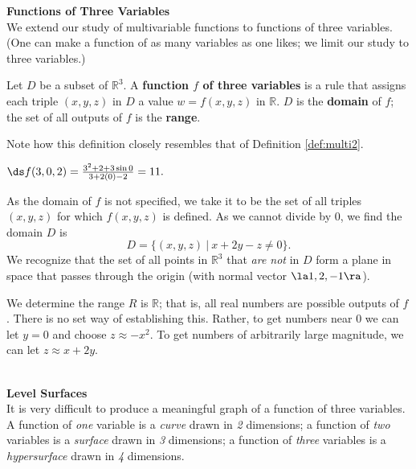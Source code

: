 \noindent\textbf{\large Functions of Three Variables}\\

We extend our study of multivariable functions to functions of three variables. (One can make a function of as many variables as one likes; we limit our study to three variables.)

{Let $D$ be a subset of $\mathbb{R}^3$. A \textbf{function $f$ of three variables} is a rule that assigns each triple $(x,y,z)$ in $D$ a value $w=f(x,y,z)$ in $\mathbb{R}$. $D$ is the \textbf{domain} of $f$; the set of all outputs of $f$ is the \textbf{range}.
}

Note how this definition closely resembles that of Definition \ref{def:multi2}.\\

{$\ds f(3,0,2) = \frac{3^2+2+3\sin 0}{3+2(0)-2} = 11.$

As the domain of $f$ is not specified, we take it to be the set of all triples $(x,y,z)$ for which $f(x,y,z)$ is defined. As we cannot divide by $0$, we find the domain $D$ is 
$$D = \{(x,y,z)\ |\ x+2y-z\neq 0\}.$$
We recognize that the set of all points in $\mathbb{R}^3$ that \textit{are not} in $D$ form a plane in space that passes through the origin (with normal vector $\la 1,2,-1\ra$). 

We determine the range $R$ is $\mathbb{R}$; that is, all real numbers are possible outputs of $f$. There is no set way of establishing this. Rather, to get numbers near 0 we can let $y=0$ and choose $z \approx -x^2$. To get numbers of arbitrarily large magnitude, we can let $z\approx x+2y$. 
}\\

\noindent\textbf{\large Level Surfaces}\\

It is very difficult to produce a meaningful graph of a function of three variables. A function of \textit{one} variable is a \textit{curve} drawn in \textit{2} dimensions; a function of \textit{two} variables is a \textit{surface} drawn in \textit{3} dimensions; a function of \textit{three} variables is a \textit{hypersurface} drawn in \textit{4} dimensions.

